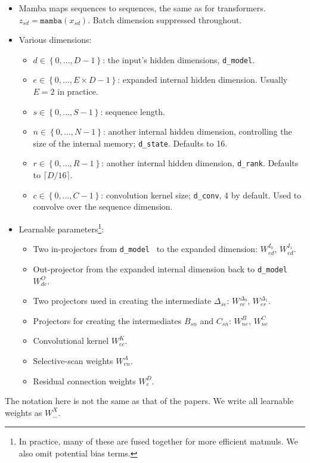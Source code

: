 \documentclass[11pt]{article}
\begin{document}
\begin{itemize}
    \item Mamba maps sequences to sequences, the same as for transformers. $ z _{ sd } =
        \texttt{mamba}\left ( x _{ sd } \right ) $. Batch dimension suppressed throughout.
    \item Various dimensions:
        \begin{itemize}
            \item $ d\in \left \{ 0, \ldots , D-1 \right \} $: the input's hidden dimensions,
                \texttt{d\_model}.
            \item $ e\in \left \{ 0, \ldots , E\times D-1 \right \} $: expanded internal hidden
                dimension. Usually $ E=2 $ in practice.
            \item $ s\in \left \{ 0, \ldots , S-1 \right \} $: sequence length.
            \item $ n\in \left \{ 0, \ldots , N-1 \right \} $: another internal hidden dimension,
                controlling the size of the internal memory; \texttt{d\_state}. Defaults to 16.
            \item $ r\in \left \{ 0, \ldots , R-1 \right \} $: another internal hidden dimension,
                \texttt{d\_rank}. Defaults to $ \lceil D /16 \rceil $.
            \item $ c\in \left \{ 0, \ldots , C-1 \right \} $: convolution kernel size;
                \texttt{d\_conv}, 4 by default. Used to convolve over the sequence dimension.
        \end{itemize}
    \item Learnable parameters\footnote{In practice, many of these are fused together for more
        efficient matmuls. We also omit potential bias terms.}:
        \begin{itemize}
            \item Two in-projectors from \texttt{d\_model } to the expanded dimension: $ W ^{ I _{ 0 } } _{ ed } $, $ W ^{ I _{ 1 } } _{ ed } $.
            \item Out-projector from the expanded internal dimension back to \texttt{d\_model } $ W ^{ O } _{ de } $.
            \item Two projectors used in creating the intermediate $ \Delta _{ se } $: $ W ^{ \Delta _{ 0 } }_{ re } $, $ W ^{ \Delta _{ 1 } }_{ er } $.
            \item Projectors for creating the intermediates $ B _{ sn } $ and $ C _{ sn } $: $ W ^{
                B } _{ ne } $, $ W ^{ C } _{ ne } $
            \item Convolutional kernel $ W ^{ K }_{ ec } $.
            \item Selective-scan weights $ W ^{ A } _{ en } $.
            \item Residual connection weights $ W ^{ D } _{ e } $.
        \end{itemize}
\end{itemize}
The notation here is not the same as that of the papers. We write all learnable weights as $ W ^{ X }_{ \ldots  } $.
\end{document}
